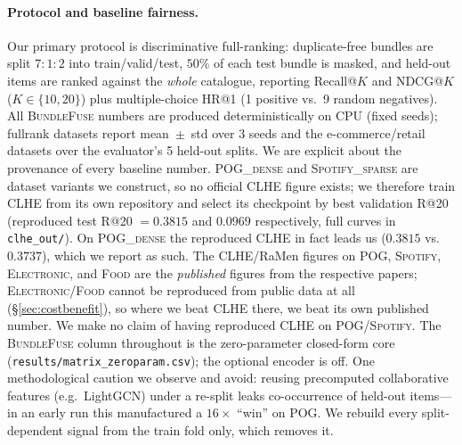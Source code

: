 \paragraph{Protocol and baseline fairness.}
Our primary protocol is discriminative full-ranking: duplicate-free bundles are split $7{:}1{:}2$ into
train/valid/test, $50\%$ of each test bundle is masked, and held-out items are ranked against the \emph{whole}
catalogue, reporting Recall@$K$ and NDCG@$K$ ($K\in\{10,20\}$) plus multiple-choice HR@1 (1 positive vs.\ 9 random
negatives). All \textsc{BundleFuse} numbers are produced deterministically on CPU (fixed seeds); fullrank datasets
report mean~$\pm$~std over 3 seeds and the e-commerce/retail datasets over the evaluator's 5 held-out splits.
We are explicit about the provenance of every baseline number. \textsc{POG\_dense} and \textsc{Spotify\_sparse} are
dataset variants we construct, so no official CLHE figure exists; we therefore train CLHE from its own repository and
select its checkpoint by best validation R@20 (reproduced test R@20 $=0.3815$ and $0.0969$ respectively, full curves
in \texttt{clhe\_out/}). On \textsc{POG\_dense} the reproduced CLHE in fact leads us ($0.3815$ vs.\ $0.3737$), which we
report as such. The CLHE/RaMen figures on \textsc{POG}, \textsc{Spotify}, \textsc{Electronic}, and \textsc{Food} are
the \emph{published} figures from the respective papers; \textsc{Electronic}/\textsc{Food} cannot be reproduced from
public data at all (\S\ref{sec:costbenefit}), so where we beat CLHE there, we beat its own published number. We make
no claim of having reproduced CLHE on \textsc{POG}/\textsc{Spotify}. The \textsc{BundleFuse} column throughout is the
zero-parameter closed-form core (\texttt{results/matrix\_zeroparam.csv}); the optional encoder is off.
One methodological caution we observe and avoid: reusing precomputed collaborative features (e.g.\ LightGCN) under a
re-split leaks co-occurrence of held-out items---in an early run this manufactured a $16\times$ ``win'' on \textsc{POG}.
We rebuild every split-dependent signal from the train fold only, which removes it.

